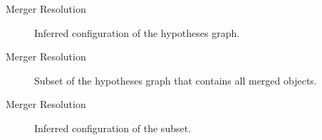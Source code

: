 \begin{frame}{Merger Resolution}
    \begin{figure}
        \centering
        \scalebox{0.7}{
            \begin{tikzpicture}[minimum size=58pt,scale=0.45, every node/.style={scale=0.45, font=\LARGE}, thick]
                
            \end{tikzpicture}
        }
        \caption{Inferred configuration of the hypotheses graph.}
        \label{fig:conservation-hyp-inferred}
    \end{figure}
\end{frame}

\begin{frame}{Merger Resolution}
    \begin{figure}
        \centering
        \scalebox{0.7}{
            \begin{tikzpicture}[minimum size=58pt,scale=0.45, every node/.style={scale=0.45, font=\LARGE}, thick]
                
            \end{tikzpicture}
        }
        \caption{Subset of the hypotheses graph that contains all merged objects.}
        \label{fig:conservation-hyp-inferred}
    \end{figure}
\end{frame}

\begin{frame}{Merger Resolution}
    \begin{figure}
        \centering
        \scalebox{0.7}{
            \begin{tikzpicture}[minimum size=58pt,scale=0.45, every node/.style={scale=0.45, font=\LARGE}, thick]
                
            \end{tikzpicture}
        }
        \caption{Inferred configuration of the subset.}
        \label{fig:conservation-hyp-inferred}
    \end{figure}
\end{frame}

